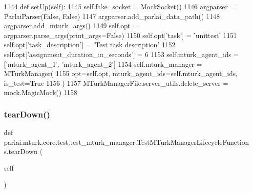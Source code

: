 \begin{DoxyCode}
1144     \textcolor{keyword}{def }setUp(self):
1145         self.fake\_socket = MockSocket()
1146         argparser = ParlaiParser(\textcolor{keyword}{False}, \textcolor{keyword}{False})
1147         argparser.add\_parlai\_data\_path()
1148         argparser.add\_mturk\_args()
1149         self.opt = argparser.parse\_args(print\_args=\textcolor{keyword}{False})
1150         self.opt[\textcolor{stringliteral}{'task'}] = \textcolor{stringliteral}{'unittest'}
1151         self.opt[\textcolor{stringliteral}{'task\_description'}] = \textcolor{stringliteral}{'Test task description'}
1152         self.opt[\textcolor{stringliteral}{'assignment\_duration\_in\_seconds'}] = 6
1153         self.mturk\_agent\_ids = [\textcolor{stringliteral}{'mturk\_agent\_1'}, \textcolor{stringliteral}{'mturk\_agent\_2'}]
1154         self.mturk\_manager = MTurkManager(
1155             opt=self.opt, mturk\_agent\_ids=self.mturk\_agent\_ids, is\_test=\textcolor{keyword}{True}
1156         )
1157         MTurkManagerFile.server\_utils.delete\_server = mock.MagicMock()
1158 
\end{DoxyCode}
\mbox{\label{classparlai_1_1mturk_1_1core_1_1test_1_1test__mturk__manager_1_1TestMTurkManagerLifecycleFunctions_a597cbfdc5382c94258e1be44af00818a}} 
\subsubsection{\texorpdfstring{tear\+Down()}{tearDown()}}
{\footnotesize\ttfamily def parlai.\+mturk.\+core.\+test.\+test\+\_\+mturk\+\_\+manager.\+Test\+M\+Turk\+Manager\+Lifecycle\+Functions.\+tear\+Down (\begin{DoxyParamCaption}\item[{}]{self }\end{DoxyParamCaption})}



